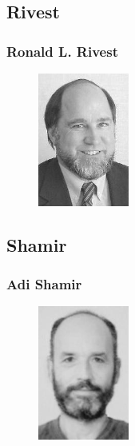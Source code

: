 \documentclass[slidestop,compress,mathserif]{beamer}
\begin{document}
\subsection{\hfill Rivest}
\begin{frame}
  \frametitle{Ronald L. Rivest}
  \begin{multicols}{2}
    \begin{figure}
      \includegraphics[width=3cm]{Rivest.jpg}
    \end{figure}
    
  \end{multicols}
  
\end{frame}

\subsection{\hfill Shamir}
\begin{frame}
  \frametitle{Adi Shamir}
  \begin{multicols}{2}
    \begin{figure}
      \includegraphics[width=3cm]{Shamir.jpg}
    \end{figure}
    
  \end{multicols}
  
\end{frame}
\end{document}

